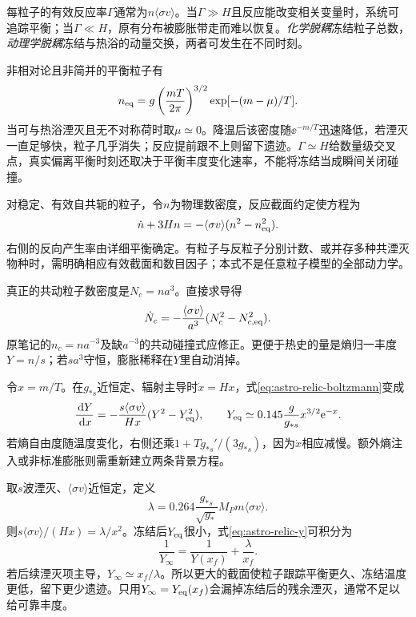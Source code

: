 每粒子的有效反应率$\Gamma$通常为$n\langle\sigma v\rangle$。当$\Gamma\gg H$且反应能改变相关变量时，系统可追踪平衡；当$\Gamma\ll H$，原有分布被膨胀带走而难以恢复。\emph{化学脱耦}冻结粒子总数，\emph{动理学脱耦}冻结与热浴的动量交换，两者可发生在不同时刻。

非相对论且非简并的平衡粒子有
\[
 n_{ \rm eq}=g\left(\frac{mT}{2\pi}\right)^{3/2}\exp[-(m-\mu)/T].
\]
当可与热浴湮灭且无不对称荷时取$\mu\simeq0$。降温后该密度随$\ee^{-m/T}$迅速降低，若湮灭一直足够快，粒子几乎消失；反应提前跟不上则留下遗迹。$\Gamma\simeq H$给数量级交叉点，真实偏离平衡时刻还取决于平衡丰度变化速率，不能将冻结当成瞬间关闭碰撞。

对稳定、有效自共轭的粒子，令$n$为物理数密度，反应截面约定使方程为
\begin{equation}\label{eq:astro-relic-boltzmann}
 \dot n+3Hn=-\langle\sigma v\rangle(n^2-n_{ \rm eq}^2).
\end{equation}
右侧的反向产生率由详细平衡确定。有粒子与反粒子分别计数、或并存多种共湮灭物种时，需明确相应有效截面和数目因子；本式不是任意粒子模型的全部动力学。

真正的共动粒子数密度是$N_c=na^3$。直接求导得
\[
 \dot N_c=-\frac{\langle\sigma v\rangle}{a^3}(N_c^2-N_{c,\rm eq}^2).
\]
原笔记的$n_c=n a^{-3}$及缺$a^{-3}$的共动碰撞式应修正。更便于热史的量是熵归一丰度$Y=n/s$；若$sa^3$守恒，膨胀稀释在$\dot Y$里自动消掉。

令$x=m/T$。在$g_{*s}$近恒定、辐射主导时$\dot x=Hx$，式\eqref{eq:astro-relic-boltzmann}变成
\begin{equation}\label{eq:astro-relic-y}
 \frac{\,\mathrm d Y}{\,\mathrm d x}=-\frac{s\langle\sigma v\rangle}{Hx}(Y^2-Y_{ \rm eq}^2),\qquad
 Y_{ \rm eq}\simeq0.145\frac g{g_{*s}}x^{3/2}\mathrm e^{-x}.
\end{equation}
若熵自由度随温度变化，右侧还乘$1+Tg_{*s}'/(3g_{*s})$，因为$\dot x$相应减慢。额外熵注入或非标准膨胀则需重新建立两条背景方程。

取$s$波湮灭、$\langle\sigma v\rangle$近恒定，定义
\[
 \lambda=0.264\frac{g_{*s}}{\sqrt{g_*}}M_Pm\langle\sigma v\rangle.
\]
则$s\langle\sigma v\rangle/(Hx)=\lambda/x^2$。冻结后$Y_{ \rm eq}$很小，式\eqref{eq:astro-relic-y}可积分为
\[
 \frac1{Y_\infty}=\frac1{Y(x_f)}+\frac\lambda{x_f}.
\]
若后续湮灭项主导，$Y_\infty\simeq x_f/\lambda$。所以更大的截面使粒子跟踪平衡更久、冻结温度更低，留下更少遗迹。只用$Y_\infty=Y_{ \rm eq}(x_f)$会漏掉冻结后的残余湮灭，通常不足以给可靠丰度。

